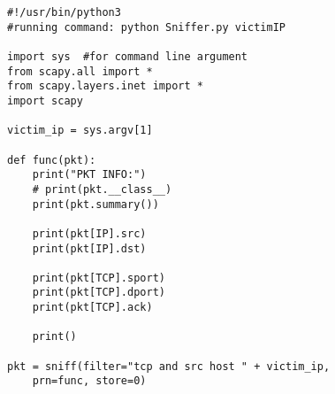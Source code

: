 \begin{verbatim}
#!/usr/bin/python3
#running command: python Sniffer.py victimIP

import sys  #for command line argument
from scapy.all import *
from scapy.layers.inet import *
import scapy

victim_ip = sys.argv[1]

def func(pkt):
    print("PKT INFO:")
    # print(pkt.__class__)
    print(pkt.summary())

    print(pkt[IP].src)
    print(pkt[IP].dst)

    print(pkt[TCP].sport)
    print(pkt[TCP].dport)
    print(pkt[TCP].ack)

    print()

pkt = sniff(filter="tcp and src host " + victim_ip, 
    prn=func, store=0)

\end{verbatim}